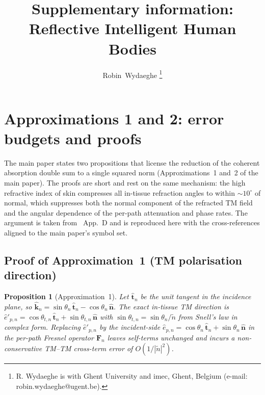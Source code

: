 \documentclass[10pt,journal,twocolumn]{IEEEtran}
\title{Supplementary information:\\
Reflective Intelligent Human Bodies}
\author{Robin~Wydaeghe%
  \thanks{R. Wydaeghe is with Ghent University and imec, Ghent, Belgium
  (e-mail: robin.wydaeghe@ugent.be).}}
\newcommand{\nhat}{\hat{\bm{n}}}
\newcommand{\Fn}{\mathbf{F}_n}
\newcommand{\ntilde}{\tilde{n}}
\theoremstyle{plain}
\newtheorem{proposition}{Proposition}[section]
\theoremstyle{definition}
\begin{document}
\maketitle

\section{Approximations 1 and 2: error budgets and proofs}\label{si:approx-proofs}

The main paper states two propositions that license the reduction of
the coherent absorption double sum to a single squared norm
(Approximations~1 and~2 of the main paper). The proofs are short and rest on
the same mechanism: the high refractive index of skin compresses all
in-tissue refraction angles to within $\sim\!10^{\circ}$ of normal,
which suppresses both the normal component of the refracted TM field
and the angular dependence of the per-path attenuation and phase
rates. The argument is taken from~\cite{WydaegheMonograph} App.~D and
is reproduced here with the cross-references aligned to the main
paper's symbol set.

\subsection{Proof of Approximation~1 (TM polarisation direction)}

\begin{proposition}[Approximation~1]\label{prop:S-approx1}
Let $\hat{\bm{t}}_n$ be the unit tangent in the incidence plane, so
$\hat{\bm{k}}_n = \sin\theta_n\,\hat{\bm{t}}_n - \cos\theta_n\,\nhat$.
The exact in-tissue TM direction is $\hat{e}'_{p,n} =
\cos\theta_{t,n}\,\hat{\bm{t}}_n + \sin\theta_{t,n}\,\nhat$ with
$\sin\theta_{t,n} = \sin\theta_n / \ntilde$ from Snell's law in
complex form. Replacing $\hat{e}'_{p,n}$ by the incident-side
$\hat{e}_{p,n} = \cos\theta_n\,\hat{\bm{t}}_n + \sin\theta_n\,\nhat$
in the per-path Fresnel operator $\Fn$ leaves self-terms unchanged
and incurs a non-conservative TM--TM cross-term error of
$O(1/|\ntilde|^2)$.
\end{proposition}
\end{document}
